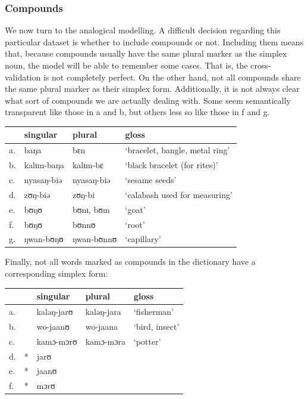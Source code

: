 \subsubsection{Compounds}

We now turn to the analogical modelling. A difficult decision regarding this particular dataset is whether to include compounds or not. Including them means that, because compounds usually have the same plural marker as the simplex noun, the model will be able to remember some cases. That is, the cross-validation is not completely perfect. On the other hand, not all compounds share the same plural marker as their simplex form. Additionally, it is not always clear what sort of compounds we are actually dealing with. Some seem semantically transparent like those in a and b, but others less so like those in f and g.

\begin{exe}
    \ex \label{different-pl-kasem}
    \begin{tabular}[t]{llll}
      & singular                         & plural     & gloss                          \\
      \midrule
      a. & baŋa       & bɛn        & `bracelet, bangle, metal ring' \\
      b. & kalɩm-baŋa & kalɩm-bɛ   & `black bracelet (for rites)'   \\
      c. & nyasaŋ-biə                       & nyasaŋ-biə & `sesame seeds'    \\
      d. & zʊŋ-biə                          & zʊŋ-bi     & `calabash used for measuring'\\
      e. & bʊŋʊ                             & bʊnɩ, bʊm  & `goat'  \\
      f. & bʊŋʊ       & bʊnnʊ      & `root'                         \\
      g. & ŋwan-bʊŋʊ  & ŋwan-bʊnnʊ & `capillary'                    \\
    \end{tabular}
\end{exe}

Finally, not all words marked as compounds in the dictionary have a corresponding simplex form:

\begin{exe}
    \ex \label{no-simplex-kasem}
    \begin{tabular}[t]{ll@{}lll}
         &   & singular   & plural     & gloss          \\
      \midrule
      a. &   & kaləŋ-jarʊ & kaləŋ-jara & `fisherman'    \\
      b. &   & wo-jaanʊ   & wo-jaana   & `bird, insect' \\
      c. &   & kamɔ-mɔrʊ  & kamɔ-mɔra  & `potter'       \\
      d. & * & jarʊ                                    \\
      e. & * & jaanʊ                                   \\
      f. & * & mɔrʊ                                    \\
    \end{tabular}
\end{exe}

